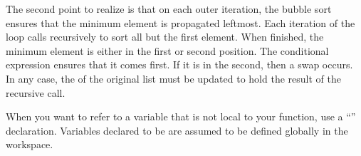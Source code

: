 The second point to realize is that on each outer iteration, the bubble sort
ensures that the minimum element is propagated leftmost.
Each iteration of the  loop calls 
recursively to sort all but the first element.
When finished, the minimum element is either in the first or second position.
The conditional expression ensures that it comes first.
If it is in the second, then a swap occurs.
In any case, the  of the original list must be updated to hold
the result of the recursive call.


When you want to refer to a variable that is not local to your
function, use a ``'' declaration.
Variables declared to be 
are assumed to be defined globally
in the
workspace.

